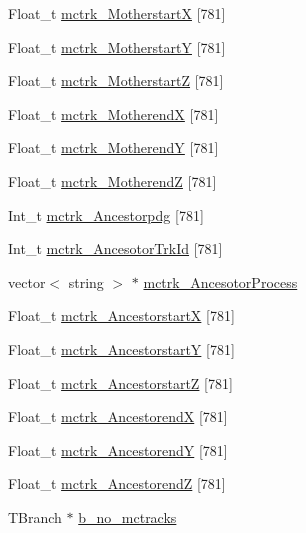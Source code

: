 \begin{DoxyCompactItemize}
\item 
Float\-\_\-t \hyperlink{classanatree_aa2b40636eb7f684ab48f720ec9a0e293}{mctrk\-\_\-\-Motherstart\-X} \mbox{[}781\mbox{]}
\item 
Float\-\_\-t \hyperlink{classanatree_a66dc0f00af6ef2ab01d47ec9651630f3}{mctrk\-\_\-\-Motherstart\-Y} \mbox{[}781\mbox{]}
\item 
Float\-\_\-t \hyperlink{classanatree_ab5f3036817f0e58b09c63c7134866451}{mctrk\-\_\-\-Motherstart\-Z} \mbox{[}781\mbox{]}
\item 
Float\-\_\-t \hyperlink{classanatree_ae629fee906b17c4ca344da2584185597}{mctrk\-\_\-\-Motherend\-X} \mbox{[}781\mbox{]}
\item 
Float\-\_\-t \hyperlink{classanatree_a8fff5a031986dba3d08518a592ca27c3}{mctrk\-\_\-\-Motherend\-Y} \mbox{[}781\mbox{]}
\item 
Float\-\_\-t \hyperlink{classanatree_a5b480d24c2601b0edafa2927e2da7935}{mctrk\-\_\-\-Motherend\-Z} \mbox{[}781\mbox{]}
\item 
Int\-\_\-t \hyperlink{classanatree_a32b98717938615eadbbe392ac02c0617}{mctrk\-\_\-\-Ancestorpdg} \mbox{[}781\mbox{]}
\item 
Int\-\_\-t \hyperlink{classanatree_adcdd8a3026ca8feb1817c4438058eb47}{mctrk\-\_\-\-Ancesotor\-Trk\-Id} \mbox{[}781\mbox{]}
\item 
vector$<$ string $>$ $\ast$ \hyperlink{classanatree_a39f3ac00257d23e09c7d76ab850f7df5}{mctrk\-\_\-\-Ancesotor\-Process}
\item 
Float\-\_\-t \hyperlink{classanatree_a6d53a3a4342de0f17aeb55b3078e8523}{mctrk\-\_\-\-Ancestorstart\-X} \mbox{[}781\mbox{]}
\item 
Float\-\_\-t \hyperlink{classanatree_a2303289878cef82f0e009e600e7b47b1}{mctrk\-\_\-\-Ancestorstart\-Y} \mbox{[}781\mbox{]}
\item 
Float\-\_\-t \hyperlink{classanatree_ab22c42b1d09acf40dd762618ee7d608d}{mctrk\-\_\-\-Ancestorstart\-Z} \mbox{[}781\mbox{]}
\item 
Float\-\_\-t \hyperlink{classanatree_ad6a37768e8fb4d82160dda13fd74f034}{mctrk\-\_\-\-Ancestorend\-X} \mbox{[}781\mbox{]}
\item 
Float\-\_\-t \hyperlink{classanatree_a15f2c4da3f6bc5fe8a8e60e2ce36a327}{mctrk\-\_\-\-Ancestorend\-Y} \mbox{[}781\mbox{]}
\item 
Float\-\_\-t \hyperlink{classanatree_a19476bc08b05e3253d627e1784806546}{mctrk\-\_\-\-Ancestorend\-Z} \mbox{[}781\mbox{]}
\item 
T\-Branch $\ast$ \hyperlink{classanatree_af97afecb81ba0eb5a8fddf818cb70802}{b\-\_\-no\-\_\-mctracks}

\end{DoxyCompactItemize}
